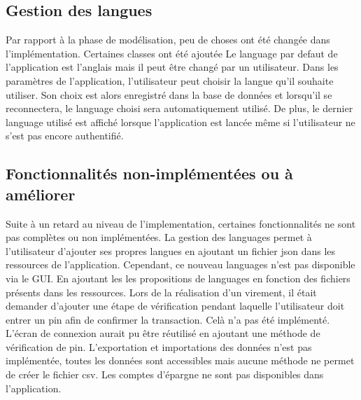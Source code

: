 \documentclass[../rapport.tex]{subfiles}
\begin{document}
\subsection{Gestion des langues}
Par rapport à la phase de modélisation, peu de choses ont été changée dans l'implémentation. Certaines classes ont été ajoutée 
Le language par defaut de l'application est l'anglais mais il peut être changé par un utilisateur. Dans les paramètres de l'application, 
l'utilisateur peut choisir la langue qu'il souhaite utiliser. Son choix est alors enregistré dans la base de données et lorsqu'il se reconnectera,
le language choisi sera automatiquement utilisé. De plus, le dernier language utilisé est affiché lorsque l'application est lancée même si l'utilisateur 
ne s'est pas encore authentifié.

\subsection{Fonctionnalités non-implémentées ou à améliorer}
Suite à un retard au niveau de l'implementation, certaines fonctionnalités ne sont pas complètes ou non implémentées.
La gestion des languages permet à l'utilisateur d'ajouter ses propres langues en ajoutant un fichier json dans les ressources de l'application. Cependant, ce nouveau
languages n'est pas disponible via le GUI. En ajoutant les les propositions de languages en fonction des fichiers présents dans les ressources. 
Lors de la réalisation d'un virement, il était demander d'ajouter une étape de vérification pendant laquelle l'utilisateur doit entrer un pin afin de confirmer la transaction.
Celà n'a pas été implémenté. L'écran de connexion aurait pu être réutilisé en ajoutant une méthode de vérification de pin.
L'exportation et importations des données n'est pas implémentée, toutes les données sont accessibles mais aucune méthode ne permet de créer le fichier csv.
Les comptes d'épargne ne sont pas disponibles dans l'application. 
\newpage
\end{document}
